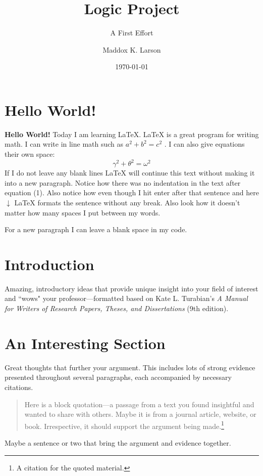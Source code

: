 \documentclass{turabian-researchpaper} %
\title{Logic Project}
\subtitle{A First Effort}
\author{Maddox K. Larson}
\date{\today}
\begin{document}
    \maketitle %
    
    \section{Hello World!} %
    
    \textbf{Hello World!} Today I am learning \LaTeX. %
     \LaTeX{} is a great program for writing math. I can write in line math such as $a^2+b^2=c^2$ %
     . I can also give equations their own space: 
    \begin{equation} %
    \gamma^2+\theta^2=\omega^2
    \end{equation}
    If I do not leave any blank lines \LaTeX{} will continue  this text without making it into a new paragraph. Notice how there was no indentation in the text after equation (1).  
    Also notice how even though I hit enter after that sentence and here $\downarrow$
     \LaTeX{} formats the sentence without any break. Also look how it doesn't matter how many spaces I put between my words.
    
    For a new paragraph I can leave a blank space in my code. 

    \section{Introduction}

    Amazing, introductory ideas that provide unique insight into your field of interest and ``wows" your professor---formatted based on Kate L. Turabian's \emph{A Manual for Writers of Research Papers, Theses, and Dissertations} (9th edition).
    
    \section{An Interesting Section}
    
    Great thoughts that further your argument. This includes lots of strong evidence presented throughout several paragraphs, each accompanied by necessary citations.
    \begin{quotation}
        \noindent Here is a block quotation---a passage from a text you found insightful and wanted to share with others. Maybe it is from a journal article, website, or book. Irrespective, it should support the argument being made.\footnote{A citation for the quoted material.}
    \end{quotation}
    Maybe a sentence or two that bring the argument and evidence together.\autocite[34]{example_source}
    
\end{document}
